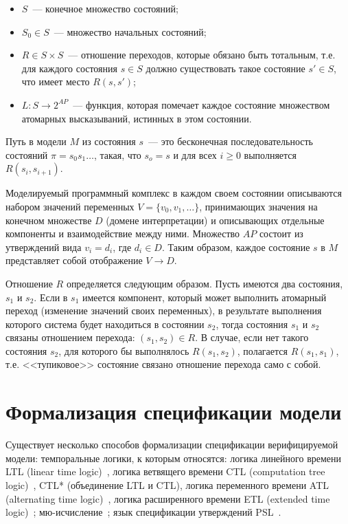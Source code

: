\documentclass[a4paper,notitlepage,14pt]{article}
\begin{document}
\begin{itemize}
\item $S$~--- конечное множество состояний;
\item $S_0 \in S$~--- множество начальных состояний;
\item $R \in S \times S$~--- отношение переходов, которые обязано быть тотальным, т.е. для
  каждого состояния $s \in S$ должно существовать такое состояние $s' \in S$, что имеет
  место $R(s, s')$;
\item $L\colon S \rightarrow 2^{AP}$~--- функция, которая помечает каждое состояние
  множеством атомарных высказываний, истинных в этом состоянии.
\end{itemize}

Путь в модели $M$ из состояния $s$~--- это бесконечная последовательность состояний $\pi =
s_0 s_1 \ldots$, такая, что $s_o = s$ и для всех $i \geq 0$ выполняется $R(s_i, s_{i+1})$.

Моделируемый программный комплекс в каждом своем состоянии описываются набором значений
переменных $V = \{v_0, v_1, \ldots\}$, принимающих значения на конечном множестве $D$
(домене интерпретации) и описывающих отдельные компоненты и взаимодействие между
ними. Множество $AP$ состоит из утверждений вида $v_i = d_i$, где $d_i \in D$. Таким
образом, каждое состояние $s$ в $M$ представляет собой отображение $V \rightarrow D$.

Отношение $R$ определяется следующим образом. Пусть имеются два состояния, $s_1$ и
$s_2$. Если в $s_1$ имеется компонент, который может выполнить атомарный переход
(изменение значений своих переменных), в результате выполнения которого система будет
находиться в состоянии $s_2$, тогда состояния $s_1$ и $s_2$ связаны отношением перехода:
$(s_1, s_2) \in R$. В случае, если нет такого состояния $s_2$, для которого бы выполнялось
$R(s_1, s_2)$, полагается $R(s_1, s_1)$, т.е. <<тупиковое>> состояние связано отношение
перехода само с собой.

\section{Формализация спецификации модели}
\label{sec:specification}

Существует несколько способов формализации спецификации верифицируемой модели:
темпоральные логики, к которым относятся: логика линейного времени LTL (linear time
logic)~\cite{Clarke,Stirling96modaland}, логика ветвящего времени CTL (computation tree
logic)~\cite{Clarke,Pandya01modelchecking}, CTL* (объединение LTL и CTL), логика
переменного времени ATL (alternating time logic)~\cite{Stirling96modaland}, логика
расширенного времени ETL (extended time logic)~\cite{Emerson90temporaland};
мю-исчисление~\cite{Leucker_parallelmodel,Emerson97modelchecking}; язык спецификации
утверждений PSL~\cite{Glazberg_psl:beyond}.
\end{document}
